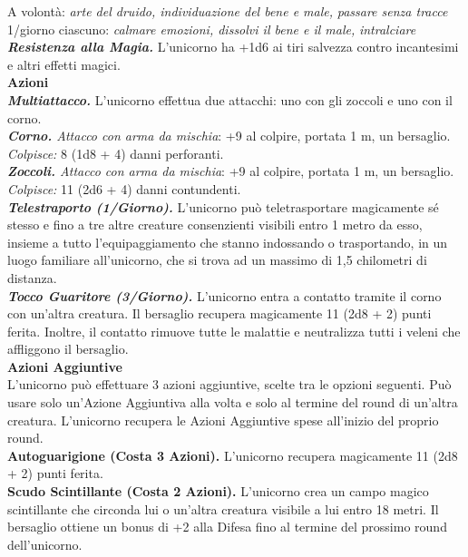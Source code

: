 \begin{multicols}{2}
A volontà: \emph{arte del druido, individuazione del bene e male,} \emph{passare senza tracce}\\
1/giorno ciascuno: \emph{calmare emozioni, dissolvi il bene e il male,} \emph{intralciare}\\
\emph{\textbf{Resistenza alla Magia.}} L'unicorno ha +1d6 ai tiri salvezza contro incantesimi e altri effetti magici.\\
\smallskip\textbf{Azioni}\\
\emph{\textbf{Multiattacco.}} L'unicorno effettua due attacchi: uno con gli zoccoli e uno con il corno.\\
\emph{\textbf{Corno.} Attacco con arma da mischia}: +9 al colpire, portata 1 m, un bersaglio.\\
\emph{Colpisce:} 8 (1d8 + 4) danni perforanti.\\
\emph{\textbf{Zoccoli.} Attacco con arma da mischia}: +9 al colpire, portata 1 m, un bersaglio.\\
\emph{Colpisce:} 11 (2d6 + 4) danni contundenti.\\
\emph{\textbf{Telestraporto (1/Giorno).}} L'unicorno può teletrasportare magicamente sé stesso e fino a tre altre creature consenzienti visibili entro 1 metro da esso, insieme a tutto l'equipaggiamento che stanno indossando o trasportando, in un luogo familiare all'unicorno, che si trova ad un massimo di 1,5 chilometri di distanza.\\
\emph{\textbf{Tocco Guaritore (3/Giorno).}} L'unicorno entra a contatto tramite il corno con un'altra creatura. Il bersaglio recupera magicamente 11 (2d8 + 2) punti ferita. Inoltre, il contatto rimuove tutte le malattie e neutralizza tutti i veleni che affliggono il bersaglio.\\
\textbf{Azioni Aggiuntive}\\
L'unicorno può effettuare 3 azioni aggiuntive, scelte tra le opzioni seguenti. Può usare solo un'Azione Aggiuntiva alla volta e solo al termine del round di un'altra creatura. L'unicorno recupera le Azioni Aggiuntive spese all'inizio del proprio round.\\
\textbf{Autoguarigione (Costa 3 Azioni).} L'unicorno recupera magicamente 11 (2d8 + 2) punti ferita.\\
\textbf{Scudo Scintillante (Costa 2 Azioni).} L'unicorno crea un campo magico scintillante che circonda lui o un'altra creatura visibile a lui entro 18 metri. Il bersaglio ottiene un bonus di +2 alla Difesa fino al termine del prossimo round dell'unicorno.\\

\end{multicols}
